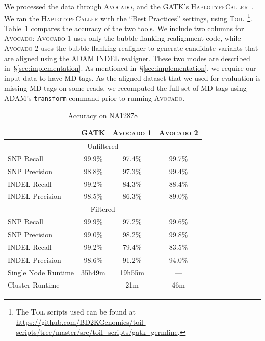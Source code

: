 \documentclass{bioinfo}
\begin{document}
We processed the data through \textsc{Avocado}, and the \textsc{GATK}'s
\textsc{HaplotypeCaller}~\citep{depristo11}. We ran the \textsc{HaplotypeCaller}
with the ``Best Practices'' settings, using
\textsc{Toil}~\citep{vivian16}\footnote{The \textsc{Toil} scripts used can be
found at \url{https://github.com/BD2KGenomics/toil-scripts/tree/master/src/toil_scripts/gatk_germline}.}.
Table~\ref{tab:accuracy} compares the accuracy of the two tools. We include two
columns for \textsc{Avocado}: \textsc{Avocado 1} uses only the bubble flanking
realignment code, while \textsc{Avocado 2} uses the bubble flanking realigner
to generate candidate variants that are aligned using the \textsc{ADAM} INDEL
realigner. These two modes are described in~\S\ref{sec:implementation}. As
mentioned in~\S\ref{sec:implementation}, we require our input data to have MD
tags. As the aligned dataset that we used for evaluation is missing MD tags on
some reads, we recomputed the full set of MD tags using \textsc{ADAM}'s
\texttt{transform} command prior to running \textsc{Avocado}.

\begin{table}[h]
\centering
\caption{Accuracy on NA12878}
\label{tab:accuracy}
\begin{tabular}{ l | c c c }
\hline
 & \bf \textsc{GATK} & \bf \textsc{Avocado 1} & \bf \textsc{Avocado 2}\\
\hline
\hline
\multicolumn{4}{c}{Unfiltered} \\
\hline
SNP Recall & 99.9\% & 97.4\% & 99.7\% \\
SNP Precision & 98.8\% & 97.3\% & 99.4\% \\
\hline
INDEL Recall & 99.2\% & 84.3\% & 88.4\% \\
INDEL Precision & 98.5\% & 86.3\% & 89.0\% \\
\hline
\multicolumn{4}{c}{Filtered} \\
\hline
SNP Recall & 99.9\% & 97.2\% & 99.6\% \\
SNP Precision & 99.0\% & 98.2\% & 99.8\% \\
\hline
INDEL Recall & 99.2\% & 79.4\% & 83.5\% \\
INDEL Precision & 98.6\% & 91.2\% & 94.0\% \\
\hline
Single Node Runtime & 35h49m & 19h55m & --- \\
Cluster Runtime & -- & 21m & 46m \\
\end{tabular}
\end{table}
\end{document}
